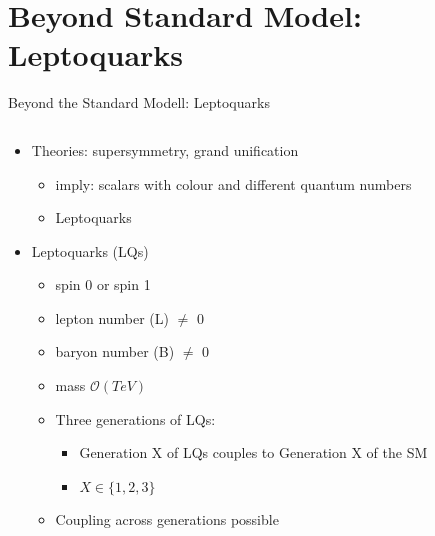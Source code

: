 \section{Beyond Standard Model: Leptoquarks}
\frame{\tableofcontents[currentsection]}
\begin{frame}{Beyond the Standard Modell: Leptoquarks}
    \begin{columns}
        \begin{column}{0.55\textwidth}
            \begin{itemize}
                \item Theories: supersymmetry, grand unification
                \begin{itemize}
                    \item imply: scalars with colour and different quantum numbers
                    \item [\rightarrow] Leptoquarks
                \end{itemize}
            \end{itemize}
            \begin{itemize}
                \item <2-> Leptoquarks (LQs)
                    \begin{itemize}
                        \item <3-> spin 0 or spin 1
                        \item <3->lepton number (L) $\neq$ 0
                        \item <3->baryon number (B) $\neq$ 0
                        \item <4->mass $\mathcal{O}\left( TeV \right)$
                        \item <5->Three generations of LQs:
                        \begin{itemize}
                            \item Generation X of LQs couples to Generation X of the SM
                            \item [] $X \in \{1, 2, 3 \}$
                        \end{itemize}
                        \item <6->Coupling across generations possible
                    \end{itemize}
            \end{itemize}
        \end{column}
        \begin{column}{0.45\textwidth}
            \begin{itemize}

\end{itemize}
\end{column}
\end{columns}
\end{frame}
